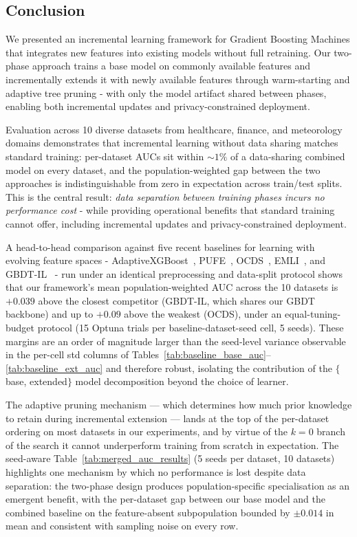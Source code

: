 \documentclass[sigconf]{acmart}
\begin{document}
\begin{itemize}
\section{Conclusion}

We presented an incremental learning framework for Gradient Boosting Machines that integrates new features into existing models without full retraining. Our two-phase approach trains a base model on commonly available features and incrementally extends it with newly available features through warm-starting and adaptive tree pruning - with only the model artifact shared between phases, enabling both incremental updates and privacy-constrained deployment.

Evaluation across 10 diverse datasets from healthcare, finance, and meteorology domains demonstrates that incremental learning without data sharing matches standard training: per-dataset AUCs sit within $\sim 1\%$ of a data-sharing combined model on every dataset, and the population-weighted gap between the two approaches is indistinguishable from zero in expectation across train/test splits. This is the central result: \textit{data separation between training phases incurs no performance cost} - while providing operational benefits that standard training cannot offer, including incremental updates and privacy-constrained deployment.

A head-to-head comparison against five recent baselines for learning with evolving feature spaces - AdaptiveXGBoost~\cite{montiel2020axgb}, PUFE~\cite{he2021pufe}, OCDS~\cite{he2019ocds}, EMLI~\cite{dong2021eml}, and GBDT-IL~\cite{chen2024gbdtil} - run under an identical preprocessing and data-split protocol shows that our framework's mean population-weighted AUC across the 10 datasets is $+0.039$ above the closest competitor (GBDT-IL, which shares our GBDT backbone) and up to $+0.09$ above the weakest (OCDS), under an equal-tuning-budget protocol (15 Optuna trials per baseline-dataset-seed cell, 5 seeds). These margins are an order of magnitude larger than the seed-level variance observable in the per-cell std columns of Tables~\ref{tab:baseline_base_auc}--\ref{tab:baseline_ext_auc} and therefore robust, isolating the contribution of the $\{$base, extended$\}$ model decomposition beyond the choice of learner.

The adaptive pruning mechanism --- which determines how much prior knowledge to retain during incremental extension --- lands at the top of the per-dataset ordering on most datasets in our experiments, and by virtue of the $k=0$ branch of the search it cannot underperform training from scratch in expectation. The seed-aware Table~\ref{tab:merged_auc_results} (5 seeds per dataset, 10 datasets) highlights one mechanism by which no performance is lost despite data separation: the two-phase design produces population-specific specialisation as an emergent benefit, with the per-dataset gap between our base model and the combined baseline on the feature-absent subpopulation bounded by $\pm 0.014$ in mean and consistent with sampling noise on every row.


\end{itemize}
\end{document}

